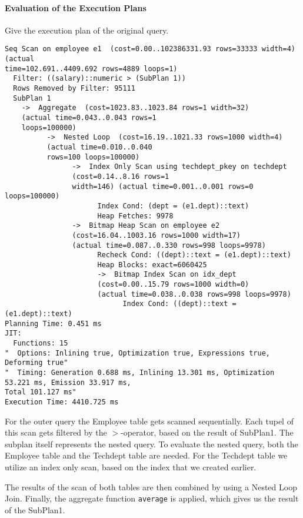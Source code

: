 \documentclass[11pt]{scrartcl}
\begin{document}
    \paragraph{Evaluation of the Execution Plans}

    Give the execution plan of the original query.

            {\small
    \parskip0pt\begin{verbatim}
Seq Scan on employee e1  (cost=0.00..102386331.93 rows=33333 width=4) (actual 
time=102.691..4409.692 rows=4889 loops=1)
  Filter: ((salary)::numeric > (SubPlan 1))
  Rows Removed by Filter: 95111
  SubPlan 1
    ->  Aggregate  (cost=1023.83..1023.84 rows=1 width=32)
    (actual time=0.043..0.043 rows=1
    loops=100000)
          ->  Nested Loop  (cost=16.19..1021.33 rows=1000 width=4)
          (actual time=0.010..0.040
          rows=100 loops=100000)
                ->  Index Only Scan using techdept_pkey on techdept
                (cost=0.14..8.16 rows=1
                width=146) (actual time=0.001..0.001 rows=0 loops=100000)
                      Index Cond: (dept = (e1.dept)::text)
                      Heap Fetches: 9978
                ->  Bitmap Heap Scan on employee e2
                (cost=16.04..1003.16 rows=1000 width=17)
                (actual time=0.087..0.330 rows=998 loops=9978)
                      Recheck Cond: ((dept)::text = (e1.dept)::text)
                      Heap Blocks: exact=6060425
                      ->  Bitmap Index Scan on idx_dept
                      (cost=0.00..15.79 rows=1000 width=0)
                      (actual time=0.038..0.038 rows=998 loops=9978)
                            Index Cond: ((dept)::text = (e1.dept)::text)
Planning Time: 0.451 ms
JIT:
  Functions: 15
"  Options: Inlining true, Optimization true, Expressions true, Deforming true"
"  Timing: Generation 0.688 ms, Inlining 13.301 ms, Optimization 53.221 ms, Emission 33.917 ms, 
Total 101.127 ms"
Execution Time: 4410.725 ms
    \end{verbatim}}

    For the outer query the Employee table gets scanned sequentially.
    Each tupel of this scan gets filtered by the $>$-operator, based on the result of SubPlan1.
    The subplan itself represents the nested query.
    To evaluate the nested query, both the Employee table and the Techdept table are needed.
    For the Techdept table we utilize an index only scan, based on the index that we created earlier.

    The results of the scan of both tables are then combined by using a Nested Loop Join.
    Finally, the aggregate function \texttt{average} is applied, which gives us the result of the SubPlan1.
\end{document}
